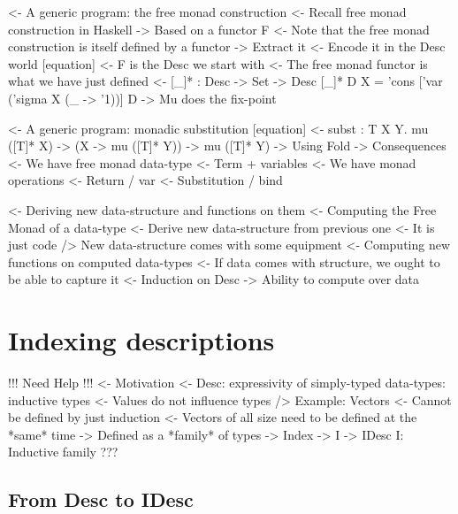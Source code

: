 \documentclass{article}
\newenvironment{structure}{\footnotesize\verbatim}{\endverbatim}
\begin{document}
\begin{structure}
<- A generic program: the free monad construction
    <- Recall free monad construction in Haskell
        -> Based on a functor F
    <- Note that the free monad construction is itself defined by a functor
        -> Extract it
    <- Encode it in the Desc world [equation]
        <- F is the Desc we start with
        <- The free monad functor is what we have just defined
        <- [\_]* : Desc -> Set -> Desc
           [\_]* D X = 'cons ['var ('sigma X (\_ -> '1))] D
        -> Mu does the fix-point
\end{structure}

\begin{structure}
<- A generic program: monadic substitution [equation]
    <- subst : \forall T X Y. mu ([T]* X) -> (X -> mu ([T]* Y)) -> mu ([T]* Y)
        -> Using Fold
    -> Consequences
        <- We have free monad data-type
            <- Term + variables
        <- We have monad operations
            <- Return / var
            <- Substitution / bind
\end{structure}

\begin{structure}
<- Deriving new data-structure and functions on them
    <- Computing the Free Monad of a data-type
        <- Derive new data-structure from previous one
            <- It is just code
        /> New data-structure comes with some equipment
    <- Computing new functions on computed data-types
        <- If data comes with structure, we ought to be able to capture it
            <- Induction on Desc
            -> Ability to compute over data
\end{structure}

\section{Indexing descriptions}

\begin{structure}
!!! Need Help !!!
<- Motivation
    <- Desc: expressivity of simply-typed data-types: inductive types
        <- Values do not influence types
    /> Example: Vectors
        <- Cannot be defined by just induction
            <- Vectors of all size need to be defined at the *same* time
            -> Defined as a *family* of types
                -> Index
        -> I -> IDesc I: Inductive family
    ???
\end{structure}

\subsection{From Desc to IDesc}
\end{document}
